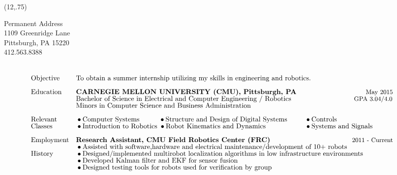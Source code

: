 \documentclass[]{article}
\newcommand{\subpoint}[1]{\bullet \text{\fontsize{10pt}{12pt}\selectfont #1}}
\newcommand{\Date}[1]{ \text{\fontsize{9pt}{12pt}\selectfont #1}}
\begin{document}
\begin{textblock}{3}(12,.75)
\begin{center}
\scriptsize
Permanent Address\\
1109 Greenridge Lane\\
Pittsburgh, PA 15220\\
412.563.8388\\
\end{center}
\end{textblock}
\begin{align*}
&\\
&\text{Objective }&&\text{To obtain a summer internship utilizing my skills in engineering and robotics.}\\[.5em]
%
%
&\text{Education} && \textbf{CARNEGIE MELLON UNIVERSITY (CMU), Pittsburgh, PA} &&
 \hspace{-.7cm} \Date{May 2015}\\[-.5em]
& && \text{Bachelor of Science in Electrical and Computer Engineering / Robotics} && 
\hspace{-1.3 cm} \Date{GPA 3.04/4.0}\\[-.5em]
& && \text{Minors in Computer Science and$  $ Business Administration}\\[.5em]
%
%
&\text{Relevant} && \subpoint{Computer Systems}
 \hspace{1cm}\subpoint{Structure and Design of Digital Systems}
 \hspace{.9cm} \subpoint{Controls} 
 && 
 \\[-.5em]
 & \text{Classes}&& \subpoint{Introduction to Robotics} 
  \hspace{.1cm} \subpoint{Robot Kinematics and Dynamics} 
   \hspace{2cm}  \subpoint{Systems and Signals}  \\[.5em]
&\text{Employment} && \textbf{Research Assistant, CMU Field Robotics Center (FRC)} && \hspace{-1.4cm} \Date{2011 - Current}\\[-.5em]
& && \subpoint{ Assisted with software,hardware and electrical maintenance/development of 10+ robots}\\[-.5em]
&\text{History} &&  \subpoint{ Designed/implemented multirobot localization algorithms in low infrastructure environments }\\[-.5em]
& && \subpoint{ Developed Kalman filter  and EKF for sensor fusion}\\[-.5em]
& && \subpoint{ Designed testing tools for robots used for verification by group} \\[-.5em]

\end{align*}
\end{document}

